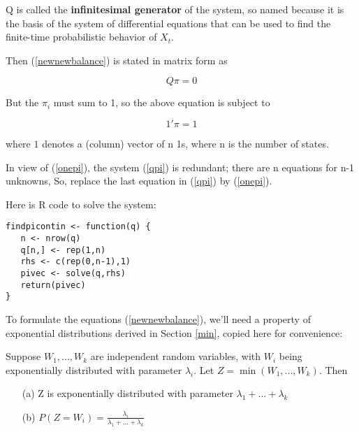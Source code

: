 Q is called the {\bf infinitesimal generator} of the system, so named
because it is the basis of the system of differential equations that can
be used to find the finite-time probabilistic behavior of $X_t$.  

% 

Then (\ref{newnewbalance}) is stated in matrix form as

\begin{equation}
\label{qpi}
Q \pi = 0
\end{equation}

But the $\pi_i$ must sum to 1, so the above equation is subject to

\begin{equation}
\label{onepi}
1' \pi = 1
\end{equation}

where $1$ denotes a (column) vector of n 1s, where n is the number of
states.

In view of (\ref{onepi}), the system (\ref{qpi}) is redundant; there are
n equations for n-1 unknowns,  So, replace the last equation in
(\ref{qpi}) by (\ref{onepi}).

Here is R code to solve the system:

\begin{lstlisting}
findpicontin <- function(q) {
   n <- nrow(q)
   q[n,] <- rep(1,n)
   rhs <- c(rep(0,n-1),1)
   pivec <- solve(q,rhs)
   return(pivec)
}
\end{lstlisting}

To formulate the equations  (\ref{newnewbalance}), we'll need a property
of exponential distributions derived in Section \ref{min}, copied here
for convenience:

\begin{theorem}

Suppose $W_{1},...,W_{k}$ are independent random variables, with $W_{i}$
being exponentially distributed with parameter $\lambda_{i}$.  Let
$Z=\min(W_{1},...,W_{k})$. Then

\begin{itemize}

\item [(a)] Z is exponentially distributed with parameter $\lambda
_{1}+...+\lambda_{k}$

\item [(b)] $P(Z=W_{i}) =
\frac{\lambda_{i}}{\lambda_{1}+...+\lambda_{k}}$

\end{itemize}

\end{theorem}

